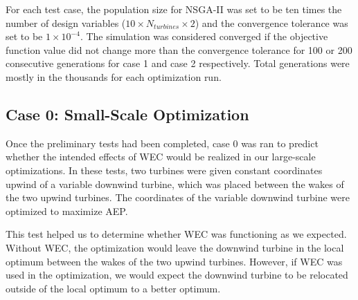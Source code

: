 \documentclass[a4paper]{jpconf}
\begin{document}
For each test case, the population size for NSGA-II was set to be ten times the number of design variables ($10\times N_{turbines} \times 2$) and the convergence tolerance was set to be $1\times10^{-4}$. The simulation was considered converged if the objective function value did not change more than the convergence tolerance for 100 or 200 consecutive generations for case 1 and case 2 respectively. Total generations were mostly in the thousands for each optimization run.



\subsection{Case 0: Small-Scale Optimization}
Once the preliminary tests had been completed, case 0 was ran to predict whether the intended effects of WEC would be realized in our large-scale optimizations. In these tests, two turbines were given constant coordinates upwind of a variable downwind turbine, which was placed between the wakes of the two upwind turbines. The coordinates of the variable downwind turbine were optimized to maximize AEP.

This test helped us to determine whether WEC was functioning as we expected. Without WEC, the optimization would leave the downwind turbine in the local optimum between the wakes of the two upwind turbines. However, if WEC was used in the optimization, we would expect the downwind turbine to be relocated outside of the local optimum to a better optimum.
\end{document}
